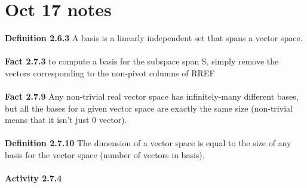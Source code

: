 \documentclass{article}
\begin{document}
\section*{Oct 17 notes}
\textbf{Definition 2.6.3} A basis is a linearly independent set that spans a vector
space.\\
\\
\textbf{Fact 2.7.3} to compute a basis for the subspace span S, simply remove
the vectors corresponding to the non-pivot columns of RREF\\
\\
\textbf{Fact 2.7.9} Any non-trivial real vector space has infinitely-many different bases,
but all the bases for a given vector space are exactly the same size (non-trivial means that it isn't just 0 vector).\\
\\
\textbf{Definition 2.7.10} The dimension of a vector space is equal to the size of
any basis for the vector space (number of vectors in basis).\\
\\
\noindent \textbf{Activity 2.7.4}\\
\end{document}
